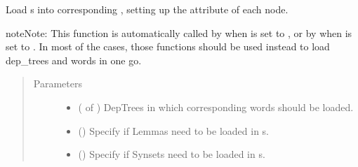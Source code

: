 \documentclass[letterpaper,10pt,english]{sphinxmanual}
\begin{document}
\begin{fulllineitems}
\label{\detokenize{load:loacore.load.word_load.load_words_in_dep_trees}}
Load  s into corresponding , setting up the attribute  of each node.

\begin{sphinxadmonition}{note}{Note:}
This function is automatically called by  when  is set to
, or by  when  is set to .
In most of the cases, those functions should be used instead to load dep\_trees and words in one go.
\end{sphinxadmonition}
\begin{quote}\begin{description}
\item[{Parameters}] \leavevmode\begin{itemize}
\item {} 
 ( of ) \textendash{} DepTrees in which corresponding words should be loaded.

\item {} 
 () \textendash{} Specify if Lemmas need to be loaded in  s.

\item {} 
 () \textendash{} Specify if Synsets need to be loaded in  s.

\end{itemize}

\end{description}\end{quote}

\end{fulllineitems}
\end{document}
